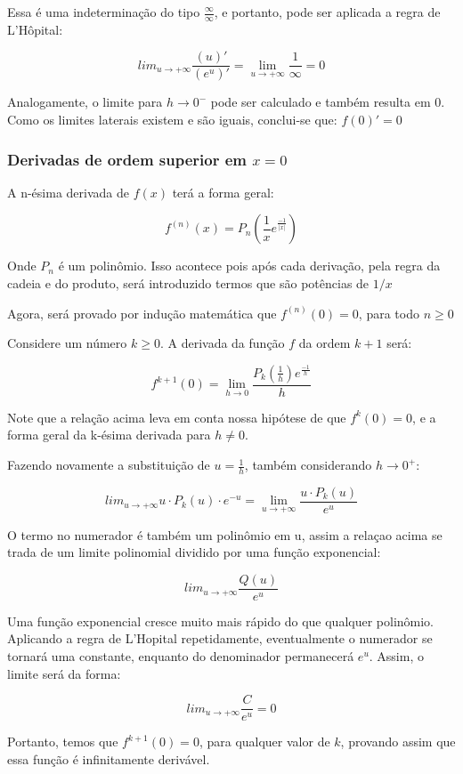 \documentclass[../resumo.tex]{subfiles}
\begin{document}
	Essa é uma indeterminação do tipo $\frac{\infty}{\infty}$, e portanto, pode ser aplicada a regra de
	L'Hôpital:

	\[lim_{u\to+\infty} \frac{(u)'}{(e^u)'} = \lim_{u\to+\infty} \frac{1}{\infty} = 0\]

	Analogamente, o limite para $h\to0^-$ pode ser calculado e também resulta em 0. Como os limites
	laterais existem e são iguais, conclui-se que: $f(0)' = 0$

	\subsubsection{Derivadas de ordem superior em $x = 0$}

	A n-ésima derivada de $f(x)$ terá a forma geral:

	\[f^{(n)}(x) = P_n(\frac{1}{x}e^{\frac{-1}{|x|}})\]

	Onde $P_n$ é um polinômio. Isso acontece pois após cada derivação, pela regra da
	cadeia e do produto, será introduzido termos que são potências de $1/x$

	Agora, será provado por indução matemática que $f^{(n)}(0) = 0$, para todo $n \geq 0$

	Considere um número $k \geq 0$. A derivada da função $f$ da ordem $k + 1$ será:

	\[f^{k + 1}(0) = \lim_{h\to0} \frac{P_k (\frac{1}{h})e^{\frac{-1}{h}}}{h}\]

	Note que a relação acima leva em conta nossa hipótese de que $f^k(0) = 0$, e a forma geral da k-ésima
	derivada para $h\neq0$.

	Fazendo novamente a substituição de $u = \frac{1}{h}$, também considerando $h\to0^+$:

	\[lim_{u\to+\infty} u\cdot P_k(u)\cdot e^{-u} = \lim_{u\to+\infty} \frac{u \cdot P_k(u)}{e^u}\]

	O termo no numerador é também um polinômio em u, assim a relaçao acima se trada de um limite polinomial
	dividido por uma função exponencial:

	\[lim_{u\to+\infty} \frac{Q(u)}{e^u}\]

	Uma função exponencial cresce muito mais rápido do que qualquer polinômio. Aplicando a regra de L'Hopital
	repetidamente, eventualmente o numerador se tornará uma constante, enquanto do denominador permanecerá
	$e^u$. Assim, o limite será da forma:

	\[lim_{u\to+\infty} \frac{C}{e^u} = 0\]

	Portanto, temos que $f^{k+1}(0) = 0$, para qualquer valor de $k$, provando assim que essa função é 
	infinitamente derivável.
\end{document}
